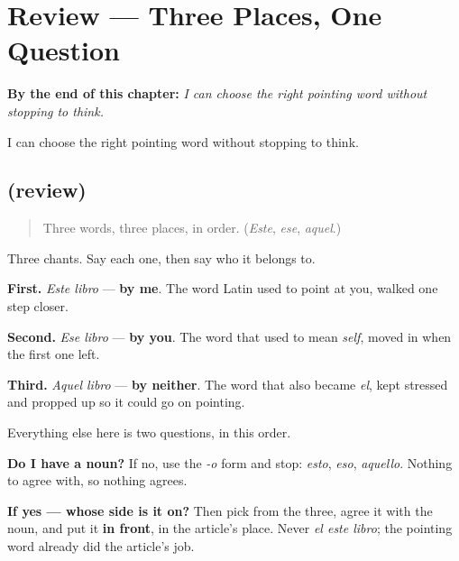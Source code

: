 
\chapter{Review --- Three Places, One Question}
\label{ch:repaso-demostrativos}

\begin{chapteropening}
\textbf{By the end of this chapter:} \emph{I can choose the right pointing word without stopping to think.}

I can choose the right pointing word without stopping to think.
\end{chapteropening}

\section[(review)]{(review)}

\label{lesson:ES-C59-repaso-demostrativos}



\begin{quote}
Three words, three places, in order. (\emph{Este}, \emph{ese}, \emph{aquel}.)
\end{quote}

\begin{grammarlens}[title={What you've built}]
Three chants. Say each one, then say who it belongs to.

\textbf{First.} \emph{Este libro} — \textbf{by me}. The word Latin used to point at you, walked one step closer.

\textbf{Second.} \emph{Ese libro} — \textbf{by you}. The word that used to mean \emph{self}, moved in when the first one left.

\textbf{Third.} \emph{Aquel libro} — \textbf{by neither}. The word that also became \emph{el}, kept stressed and propped up so it could go on pointing.
\end{grammarlens}

\begin{grammarlens}[title={Grammar Lens: one question, asked twice}]
Everything else here is two questions, in this order.

\textbf{Do I have a noun?} If no, use the \emph{-o} form and stop: \emph{esto}, \emph{eso}, \emph{aquello}. Nothing to agree with, so nothing agrees.

\textbf{If yes — whose side is it on?} Then pick from the three, agree it with the noun, and put it \textbf{in front}, in the article's place. Never \emph{el este libro}; the pointing word already did the article's job.
\end{grammarlens}

